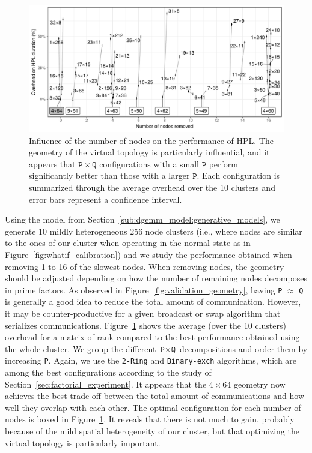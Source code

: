         \begin{figure}[htpb]
            \centering
            \includegraphics[width=\linewidth]{img/prediction/sensibility/spatial/whatif_removing_nodes.pdf}
            \caption{Influence of the number of nodes on the performance of HPL\@. The geometry of the virtual topology
                is particularly influential, and it appears that $\mathtt{P}\times\mathtt{Q}$ configurations with a small
                $\mathtt{P}$ perform significantly better than those with a larger $\mathtt{P}$. Each configuration is
                summarized through the average overhead over the 10 clusters and error bars represent a 
                confidence interval.
            }
            \label{fig:whatif_removing_nodes}
        \end{figure}

        Using the model from Section~\ref{sub:dgemm_model:generative_models}, we generate 10 mildly heterogeneous 256
        node clusters (i.e., where nodes are similar to the ones of our cluster when operating in the normal state as in
        Figure~\ref{fig:whatif_calibration}) and we study the performance obtained when removing 1 to 16 of the slowest
        nodes. When removing nodes, the geometry should be adjusted depending on how the number of remaining nodes
        decomposes in prime factors. As observed in Figure~\ref{fig:validation_geometry}, having \texttt{P} \(\approx\)
        \texttt{Q} is generally a good idea to reduce the total amount of communication. However, it may be
        counter-productive for a given broadcast or swap algorithm that serializes communications.
        Figure~\ref{fig:whatif_removing_nodes} shows the average (over the 10 clusters) overhead for a matrix of rank
         compared to the best performance obtained using the whole cluster. We group the different
        \(\texttt{P}\times\texttt{Q}\) decompositions and order them by increasing \texttt{P}. Again, we use the
        \texttt{2-Ring} and \texttt{Binary-exch} algorithms, which are among the best configurations according to the
        study of Section~\ref{sec:factorial_experiment}. It appears that the \(4\times64\) geometry now achieves the
        best trade-off between the total amount of communications and how well they overlap with each other. The optimal
        configuration for each number of nodes is boxed in Figure~\ref{fig:whatif_removing_nodes}. It reveals that there
        is not much to gain, probably because of the mild spatial heterogeneity of our cluster, but that optimizing the
        virtual topology is particularly important.

